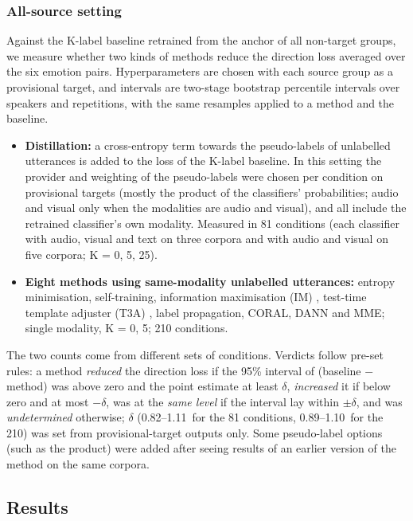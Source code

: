 \subsubsection{All-source setting}\label{sec:rq1a-all}
Against the K-label baseline retrained from the anchor of all non-target groups, we measure whether two kinds of methods reduce the direction loss averaged over the six emotion pairs. Hyperparameters are chosen with each source group as a provisional target, and intervals are two-stage bootstrap percentile intervals over speakers and repetitions, with the same resamples applied to a method and the baseline.
\begin{itemize}
\item \textbf{Distillation:} a cross-entropy term towards the pseudo-labels of unlabelled utterances is added to the loss of the K-label baseline. In this setting the provider and weighting of the pseudo-labels were chosen per condition on provisional targets (mostly the product of the classifiers' probabilities; audio and visual only when the modalities are audio and visual), and all include the retrained classifier's own modality. Measured in 81 conditions (each classifier with audio, visual and text on three corpora and with audio and visual on five corpora; K = 0, 5, 25).
\item \textbf{Eight methods using same-modality unlabelled utterances:} entropy minimisation, self-training, information maximisation (IM) \cite{liang2020,boudiaf2020}, test-time template adjuster (T3A) \cite{iwasawa2021}, label propagation, CORAL, DANN and MME; single modality, K = 0, 5; 210 conditions.
\end{itemize}
The two counts come from different sets of conditions. Verdicts follow pre-set rules: a method \emph{reduced} the direction loss if the 95\% interval of (baseline $-$ method) was above zero and the point estimate at least $\delta$, \emph{increased} it if below zero and at most $-\delta$, was at the \emph{same level} if the interval lay within $\pm\delta$, and was \emph{undetermined} otherwise; $\delta$ (0.82--1.11\pt\ for the 81 conditions, 0.89--1.10\pt\ for the 210) was set from provisional-target outputs only. Some pseudo-label options (such as the product) were added after seeing results of an earlier version of the method on the same corpora.

\subsection{Results}

